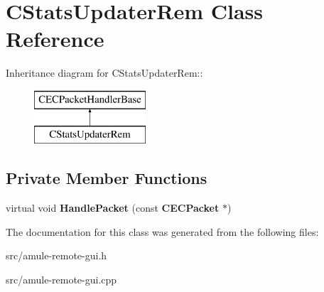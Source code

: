 \section{CStatsUpdaterRem Class Reference}
\label{classCStatsUpdaterRem}
Inheritance diagram for CStatsUpdaterRem::\begin{figure}[H]
\begin{center}
\leavevmode
\includegraphics[height=2cm]{classCStatsUpdaterRem}
\end{center}
\end{figure}
\subsection*{Private Member Functions}
\begin{DoxyCompactItemize}
\item 
virtual void {\bfseries HandlePacket} (const {\bf CECPacket} $\ast$)\label{classCStatsUpdaterRem_afcaca0d4f421b84cec8fd9ceaa4dbce3}

\end{DoxyCompactItemize}


The documentation for this class was generated from the following files:\begin{DoxyCompactItemize}
\item 
src/amule-\/remote-\/gui.h\item 
src/amule-\/remote-\/gui.cpp\end{DoxyCompactItemize}
